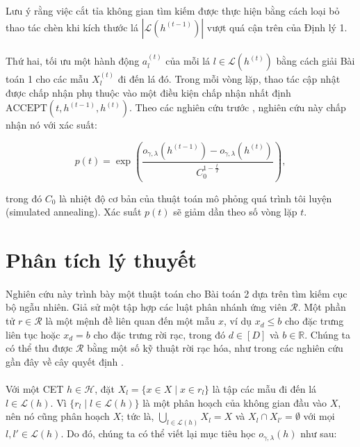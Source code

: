 \noindent
Lưu ý rằng việc cắt tỉa không gian tìm kiếm được thực hiện bằng cách loại bỏ thao tác chèn khi kích thước lá \(|\mathcal{L}(h^{(t-1)})|\) vượt quá cận trên của Định lý 1.  

\paragraph{} Thứ hai, tối ưu một hành động \(a^{(t)}_l\) của mỗi lá \(l \in \mathcal{L}(h^{(t)})\) bằng cách giải Bài toán 1 cho các mẫu \(X^{(t)}_l\) đi đến lá đó. Trong mỗi vòng lặp, thao tác cập nhật được chấp nhận phụ thuộc vào một điều kiện chấp nhận nhất định \(\text{ACCEPT}(t, h^{(t-1)}, h^{(t)})\). Theo các nghiên cứu trước \parencite{wang2019gainingfreelowcosttransparency, pan2020interpretablecompanionsblackboxmodels}, nghiên cứu này chấp nhận nó với xác suất:  

\[
p(t) = \exp \left( \frac{o_{\gamma, \lambda}(h^{(t-1)}) - o_{\gamma, \lambda}(h^{(t)})}{C_0^{1-\frac{t}{T}}} \right),
\]

\noindent
trong đó \(C_0\) là nhiệt độ cơ bản của thuật toán mô phỏng quá trình tôi luyện (simulated annealing). Xác suất \(p(t)\) sẽ giảm dần theo số vòng lặp \(t\).

\section{Phân tích lý thuyết}

\paragraph{} Nghiên cứu này trình bày một thuật toán cho Bài toán 2 dựa trên tìm kiếm cục bộ ngẫu nhiên. Giả sử một tập hợp các luật phân nhánh ứng viên \(\mathcal{R}\). Một phần tử \(r \in \mathcal{R}\) là một mệnh đề liên quan đến một mẫu \(x\), ví dụ \(x_d \leq b\) cho đặc trưng liên tục hoặc \(x_d = b\) cho đặc trưng rời rạc, trong đó \(d \in [D]\) và \(b \in \mathbb{R}\). Chúng ta có thể thu được \(\mathcal{R}\) bằng một số kỹ thuật rời rạc hóa, như trong các nghiên cứu gần đây về cây quyết định \parencite{hu2019optimal, aglin2020learning}.

\paragraph{} Với một CET \(h \in \mathcal{H}\), đặt \(X_l = \{x \in X \mid x \in r_l\}\) là tập các mẫu đi đến lá \(l \in \mathcal{L}(h)\). Vì \(\{r_l \mid l \in \mathcal{L}(h)\}\) là một phân hoạch của không gian đầu vào \(X\), nên nó cũng phân hoạch \(X\); tức là, \(\bigcup_{l \in \mathcal{L}(h)} X_l = X\) và \(X_l \cap X_{l'} = \emptyset\) với mọi \(l, l' \in \mathcal{L}(h)\). Do đó, chúng ta có thể viết lại mục tiêu học \(o_{\gamma, \lambda}(h)\) như sau:


